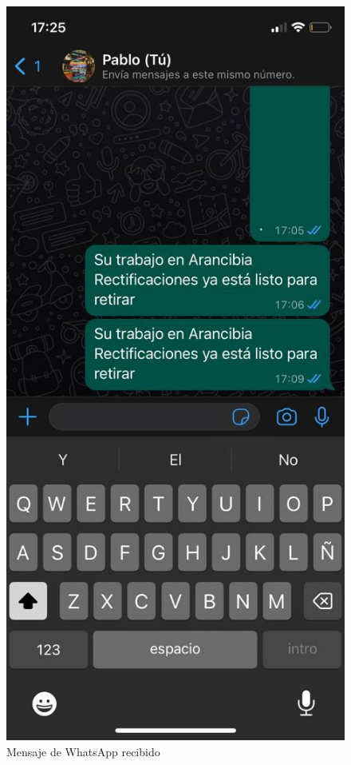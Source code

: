 \begin{figure}[H]
	\centering
	\includegraphics[scale=.30]{./Figures/ensayo-1/15.qr-api-2.jpeg}
	\caption{Mensaje de WhatsApp recibido}
	\label{fig:ensayomensajecel2}
\end{figure}

